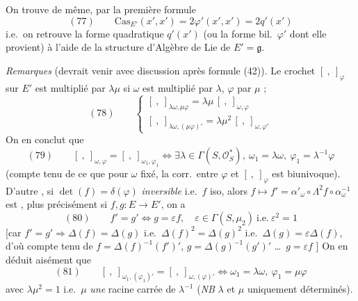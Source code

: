 \documentclass[11pt,a4paper]{article}
\begin{document}
On trouve de même, par la première formule
\[
  (77) \qquad \mathrm{Cas}_{E'}(x', x') = 2\varphi'(x', x') = 2q'(x')
\]
i.e.\ on retrouve la forme quadratique $q'(x')$ (ou la forme bil.\ $\varphi'$
dont elle provient) à l'aide de la structure d'Algèbre de Lie de
$E' = \mathfrak{g}$.

\emph{Remarques} (devrait venir avec discussion après formule (42)). Le
crochet $[\ ,\ ]_{\varphi}$ \add{$= [\ ,\ ]_{\varphi, \omega}$} sur $E'$ est
multiplié par $\lambda\mu$ si $\omega$ est multiplié par $\lambda$, $\varphi$
par $\mu$ ; \struck{\ill{}}
\[
  (78) \qquad
  \begin{cases}
    [\ ,\ ]_{\lambda\omega, \mu\varphi} = \lambda\mu\, [\ ,\ ]_{\omega, \varphi} \\
    [\ ,\ ]_{\lambda\omega, (\mu\varphi)'} = \lambda\mu^2\, [\ ,\ ]_{\omega, \varphi'}
  \end{cases}
\]
On en conclut que
\[
  (79) \qquad [\ ,\ ]_{\omega, \varphi} = [\ ,\ ]_{\omega_1, \varphi_1}
  \iff \exists \lambda \in \Gamma(S, \mathcal{O}_S^{*}),\ \omega_1 = \lambda\omega,\ \varphi_1 = \lambda^{-1}\varphi
\]
(compte tenu de ce que pour $\omega$ fixé, la corr.\ entre $\varphi$ et
$[\ ,\ ]_{\varphi}$ est biunivoque). D'autre  , si $\det(f) = \delta(\varphi)$ \emph{inversible} i.e.\ $f$ iso, alors
$f \mapsto f' = \alpha'_{\omega} \circ \Lambda^2 f \circ \alpha_{\omega}^{-1}$
est   ,
\struck{\ill{}} plus précisément si $f, g : E \to E'$, on a
\[
  (80) \qquad f' = g' \iff g = \varepsilon f , \quad \varepsilon \in \Gamma(S, \mu_2) \ \text{i.e.}\ \varepsilon^2 = 1
\]
[car $f' = g' \Rightarrow \Delta(f) = \Delta(g)$ i.e.\ $\Delta(f)^2 = \Delta(g)^2$
i.e.\ $\Delta(g) = \varepsilon\Delta(f)$, d'où compte tenu de
$f = \Delta(f)^{-1}(f')'$, $g = \Delta(g)^{-1}(g')'$ \ldots\ $g = \varepsilon f$ ]
On en déduit aisément que
\[
  (81) \qquad [\ ,\ ]_{\omega_1, (\varphi_1)'} = [\ ,\ ]_{\omega, (\varphi)'}
  \iff \omega_1 = \lambda\omega ,\ \varphi_1 = \mu\varphi
\]
avec $\lambda\mu^2 = 1$ i.e.\ $\mu$ \emph{une} racine carrée de $\lambda^{-1}$
(\emph{NB} $\lambda$ et $\mu$ uniquement déterminés).
\end{document}
